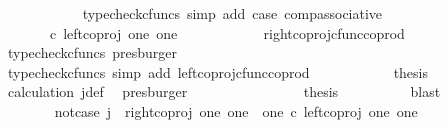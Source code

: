 \begin{isabellebody}
\ \ \ \ \ \ \ \ \ \ \isamarkupfalse%
\ {\isacharparenleft}{\kern0pt}typecheck{\isacharunderscore}{\kern0pt}cfuncs{\isacharcomma}{\kern0pt}\ simp\ add{\isacharcolon}{\kern0pt}\ case{}\ comp{\isacharunderscore}{\kern0pt}associative{}{\isacharparenright}{\kern0pt}\isanewline
\ \ \ \ \ \ \ \ \isamarkupfalse%
\ \isamarkupfalse%
\ {\isachardoublequoteopen}{\isachardot}{\kern0pt}{\isachardot}{\kern0pt}{\isachardot}{\kern0pt}\ {\isacharequal}{\kern0pt}\ {\isacharparenleft}{\kern0pt}{\isasymlangle}{\isasymt}{\isacharcomma}{\kern0pt}\ {\isasymf}{\isasymrangle}\ {\isasymamalg}{\isasymlangle}{\isasymf}{\isacharcomma}{\kern0pt}\ {\isasymt}{\isasymrangle}{\isacharparenright}{\kern0pt}\ {\isasymcirc}\isactrlsub c\ left{\isacharunderscore}{\kern0pt}coproj\ one\ one{\isachardoublequoteclose}\isanewline
\ \ \ \ \ \ \ \ \ \ \isamarkupfalse%
\ right{\isacharunderscore}{\kern0pt}coproj{\isacharunderscore}{\kern0pt}cfunc{\isacharunderscore}{\kern0pt}coprod\ \isamarkupfalse%
\ {\isacharparenleft}{\kern0pt}typecheck{\isacharunderscore}{\kern0pt}cfuncs{\isacharcomma}{\kern0pt}\ presburger{\isacharparenright}{\kern0pt}\isanewline
\ \ \ \ \ \ \ \ \isamarkupfalse%
\ \isamarkupfalse%
\ {\isachardoublequoteopen}{\isachardot}{\kern0pt}{\isachardot}{\kern0pt}{\isachardot}{\kern0pt}\ {\isacharequal}{\kern0pt}\ {\isasymlangle}{\isasymt}{\isacharcomma}{\kern0pt}\ {\isasymf}{\isasymrangle}{\isachardoublequoteclose}\isanewline
\ \ \ \ \ \ \ \ \ \ \isamarkupfalse%
\ {\isacharparenleft}{\kern0pt}typecheck{\isacharunderscore}{\kern0pt}cfuncs{\isacharcomma}{\kern0pt}\ simp\ add{\isacharcolon}{\kern0pt}\ left{\isacharunderscore}{\kern0pt}coproj{\isacharunderscore}{\kern0pt}cfunc{\isacharunderscore}{\kern0pt}coprod{\isacharparenright}{\kern0pt}\isanewline
\ \ \ \ \ \ \ \ \isamarkupfalse%
\ \isamarkupfalse%
\ {\isacharquery}{\kern0pt}thesis\isanewline
\ \ \ \ \ \ \ \ \ \ \isamarkupfalse%
\ calculation\ j{\isacharunderscore}{\kern0pt}def\ \isamarkupfalse%
\ presburger\isanewline
\ \ \ \ \ \ \isamarkupfalse%
\isanewline
\ \ \ \ \ \ \isamarkupfalse%
\ \isamarkupfalse%
\ {\isacharquery}{\kern0pt}thesis\isanewline
\ \ \ \ \ \ \ \ \isamarkupfalse%
\ blast\isanewline
\ \ \ \ \isamarkupfalse%
\isanewline
\ \ \ \ \ \ \isamarkupfalse%
\ not{\isacharunderscore}{\kern0pt}case{}{\isacharcolon}{\kern0pt}\ {\isachardoublequoteopen}j\ {\isasymnoteq}\ right{\isacharunderscore}{\kern0pt}coproj\ one\ {\isacharparenleft}{\kern0pt}one\ {\isasymCoprod}\ one{\isacharparenright}{\kern0pt}\ {\isasymcirc}\isactrlsub c\ left{\isacharunderscore}{\kern0pt}coproj\ one\ one{\isachardoublequoteclose}\isanewline

\end{isabellebody}
